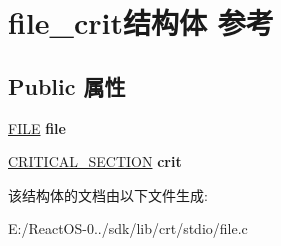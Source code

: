 \hypertarget{structfile__crit}{}\section{file\+\_\+crit结构体 参考}
\label{structfile__crit}
\subsection*{Public 属性}
\begin{DoxyCompactItemize}
\item 
\mbox{\label{structfile__crit_a5293f4e3127f462ca58ff265b173e448}} 
\hyperlink{struct__iobuf}{F\+I\+LE} {\bfseries file}
\item 
\mbox{\label{structfile__crit_abc2eb72949a21637c6ba520dc9cfdf31}} 
\hyperlink{struct___c_r_i_t_i_c_a_l___s_e_c_t_i_o_n}{C\+R\+I\+T\+I\+C\+A\+L\+\_\+\+S\+E\+C\+T\+I\+ON} {\bfseries crit}
\end{DoxyCompactItemize}


该结构体的文档由以下文件生成\+:\begin{DoxyCompactItemize}
\item 
E\+:/\+React\+O\+S-\/0../sdk/lib/crt/stdio/file.\+c\end{DoxyCompactItemize}
